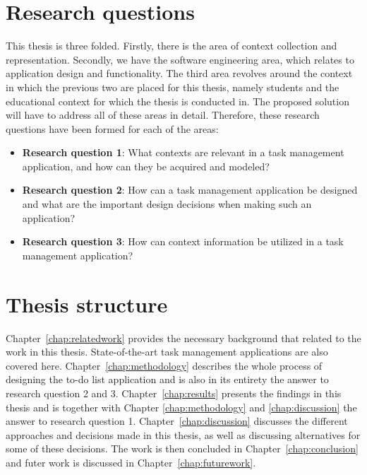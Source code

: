 \section{Research questions}

This thesis is three folded. Firstly, there is the area of context collection and representation. Secondly, we have the software engineering area, which relates to application design and functionality. The third area revolves around the context in which the previous two are placed for this thesis, namely students and the educational context for which the thesis is conducted in. The proposed solution will have to address all of these areas in detail. Therefore, these research questions have been formed for each of the areas:
\begin{itemize}
	\item \textbf{Research question 1}: What contexts are relevant in a task management application, and how can they be acquired and modeled?
	\item \textbf{Research question 2}: How can a task management application be designed and what are the important design decisions when making such an application?
	\item \textbf{Research question 3}: How can context information be utilized in a task management application?
\end{itemize}

\section{Thesis structure}
Chapter~\ref{chap:relatedwork} provides the necessary background that related to the work in this thesis. State-of-the-art task management applications are also covered here. Chapter~\ref{chap:methodology} describes the whole process of designing the to-do list application and is also in its entirety the answer to research question 2 and 3. Chapter~\ref{chap:results} presents the findings in this thesis and is together with Chapter \ref{chap:methodology} and \ref{chap:discussion} the answer to research question 1. Chapter~\ref{chap:discussion} discusses the different approaches and decisions made in this thesis, as well as discussing alternatives for some of these decisions. The work is then concluded in Chapter~\ref{chap:conclusion} and futer work is discussed in Chapter~\ref{chap:futurework}.
